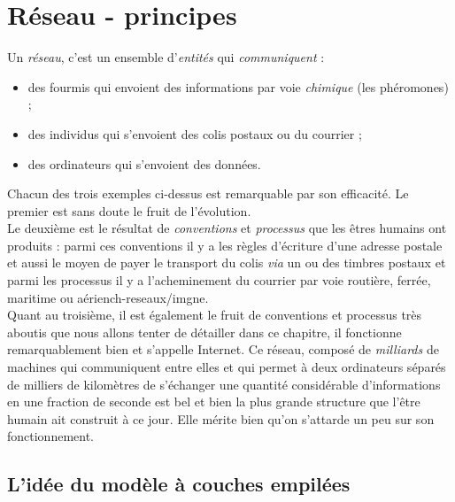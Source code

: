 \chapter{Réseau - principes}

Un \textit{réseau}, c'est un ensemble d'\textit{entités} qui \textit{communiquent} :
\begin{itemize}
    \item 	des fourmis qui envoient des informations par voie \textit{chimique} (les phéromones)  ;
    \item 	des individus qui s'envoient des colis postaux ou du courrier  ;
    \item 	des ordinateurs qui s'envoient des données.
\end{itemize}
Chacun des trois exemples ci-dessus est remarquable par son efficacité.
Le premier est sans doute le fruit de l'évolution.\\
Le deuxième est le résultat de \textit{conventions} et \textit{processus} que les êtres humains ont produits : parmi ces conventions il y a les règles d'écriture d'une adresse postale et aussi le moyen de payer le transport du colis \textit{via} un ou des timbres postaux et parmi les processus il y a l'acheminement du courrier par voie routière, ferrée, maritime ou aériench-reseaux/imgne.\\
Quant au troisième, il est également le fruit de conventions et processus très aboutis que nous allons tenter de détailler dans ce chapitre, il fonctionne remarquablement bien et s'appelle Internet. Ce réseau, composé de \textit{milliards} de machines qui communiquent entre elles et qui permet à deux ordinateurs séparés de milliers de kilomètres de s'échanger une quantité considérable d'informations en une fraction de seconde est bel et bien la plus grande structure que l'être humain ait construit à ce jour. Elle mérite bien qu'on s'attarde un peu sur son fonctionnement.\\

\section{L'idée du modèle à couches empilées}

